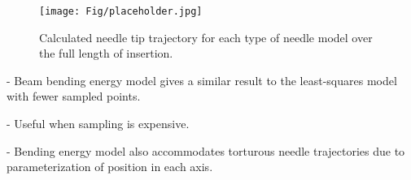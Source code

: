\begin{figure}[h]
\texttt{[image: Fig/placeholder.jpg]}
\caption{Calculated needle tip trajectory for each type of needle model over the full length of insertion.}
\label{fig:pose_error}
\end{figure}

- Beam bending energy model gives a similar result to the least-squares model with fewer sampled points.

- Useful when sampling is expensive.

- Bending energy model also accommodates torturous needle trajectories due to parameterization of position in each axis.

    

    

    







